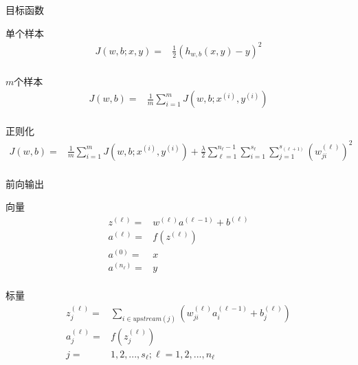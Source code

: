 \begin{frame}{目标函数}
\begin{block}{单个样本}
\[\begin{aligned}
  J(w,b;x,y) =  & \frac{1}{2}{\left( {{h_{w,b}}(x,y) - y} \right)^2} \\ 
\end{aligned} \]
\end{block}

\begin{block}{$m$个样本}
\[\begin{aligned}
  J(w,b) =  & \frac{1}{m}\sum\limits_{i = 1}^m {J\left( {w,b;{x^{(i)}},{y^{(i)}}} \right)} \\ 
\end{aligned} \]
\end{block}

\begin{block}{正则化}
\[\begin{aligned}
  J(w,b) =  & \frac{1}{m}\sum\limits_{i = 1}^m {J\left( {w,b;{x^{(i)}},{y^{(i)}}} \right)}  + \frac{\lambda }{2}\sum\limits_{\ell  = 1}^{{n_{\ell} - 1}} {\sum\limits_{i = 1}^{{s_\ell }} {\sum\limits_{j = 1}^{{s_{(\ell  + 1)}}} {{{\left( {w_{ji}^{(\ell )}} \right)}^2}} } }  \\ 
\end{aligned} \]

\end{block}
\end{frame}

\begin{frame}{前向输出}
\begin{block}{向量}
\[\begin{aligned}
  {z^{(\ell)}} =  & {w^{(\ell)}}{a^{(\ell-1)}} + {b^{(\ell)}} \\ 
  {a^{(\ell)}} =  & f({z^{(\ell)}}) \\ 
  {a^{(0)}} =  & x \\
  {a^{({n_{\ell}})}} = & y \\
\end{aligned} \]
\end{block}

\begin{block}{标量}
\[\begin{aligned}
  z_j^{(\ell )} =  & \sum\limits_{i \in upstream(j)} {\left( {w_{ji}^{(\ell )}a_i^{(\ell  - 1)} + {b_{j}^{(\ell )}}} \right)}  \\ 
  a_j^{(\ell )} =  & f\left( {z_j^{(\ell )}} \right) \\ 
  j =  & 1,2,...,{s_\ell }; \ell = 1,2,...,{n_\ell } \\  
\end{aligned} \]
\end{block}
\end{frame}

